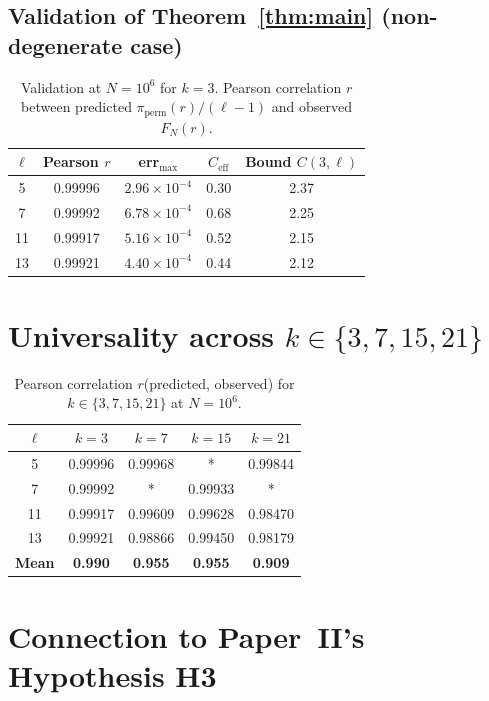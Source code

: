 \documentclass[11pt,a4paper]{article}
\theoremstyle{plain}
\theoremstyle{definition}
\newcommand{\PiP}{\pi_{\mathrm{perm}}}
\begin{document}
\subsection{Validation of Theorem~\ref{thm:main} (non-degenerate case)}

\begin{table}[h!]
\centering
\caption{Validation at $N = 10^6$ for $k = 3$. Pearson correlation $r$ between
predicted $\PiP(r)/(\ell-1)$ and observed $F_N(r)$.}
\begin{tabular}{c c c c c}
\toprule
$\ell$ & Pearson $r$ & err$_{\max}$ & $C_{\mathrm{eff}}$ & Bound $C(3, \ell)$ \\
\midrule
5 & 0.99996 & $2.96 \times 10^{-4}$ & 0.30 & 2.37 \\
7 & 0.99992 & $6.78 \times 10^{-4}$ & 0.68 & 2.25 \\
11 & 0.99917 & $5.16 \times 10^{-4}$ & 0.52 & 2.15 \\
13 & 0.99921 & $4.40 \times 10^{-4}$ & 0.44 & 2.12 \\
\bottomrule
\end{tabular}
\end{table}

\section{Universality across $k \in \{3, 7, 15, 21\}$}
\label{sec:universality}

\begin{table}[h!]
\centering
\caption{Pearson correlation $r$(predicted, observed) for $k \in \{3, 7, 15, 21\}$
at $N = 10^6$.}
\begin{tabular}{c c c c c}
\toprule
$\ell$ & $k=3$ & $k=7$ & $k=15$ & $k=21$ \\
\midrule
5 & 0.99996 & 0.99968 & * & 0.99844 \\
7 & 0.99992 & * & 0.99933 & * \\
11 & 0.99917 & 0.99609 & 0.99628 & 0.98470 \\
13 & 0.99921 & 0.98866 & 0.99450 & 0.98179 \\
\midrule
\textbf{Mean} & \textbf{0.990} & \textbf{0.955} & \textbf{0.955} & \textbf{0.909} \\
\bottomrule
\end{tabular}
\end{table}

\section{Connection to Paper~II's Hypothesis H3}
\label{sec:connection}
\end{document}
